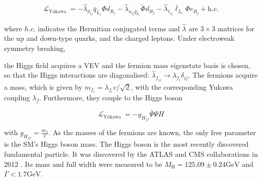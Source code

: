 \begin{equation}
  \mathcal{L}_{\text {Yukawa }}=-\hat{\lambda}_{d_{i j}} \bar{q}_{L_{i}} \Phi d_{R_{j}}-\hat{\lambda}_{u_{i j} \bar{q}_{L_{i}}} \tilde{\Phi} d_{R_{j}}-\hat{\lambda}_{\ell_{i j}} \bar{\ell}_{L_{i}} \Phi e_{R_{j}}+\text {h.c.}
\end{equation}

where $h.c.$ indicates the Hermitian conjugated terms and $\hat{\lambda}$ are $3 \times 3$ matrices for the up and down-type quarks, and the charged leptons. Under electroweak symmetry breaking,

the Higgs field acquires a VEV and the fermion mass eigenstate basis is chosen, so that the Higgs interactions are diagonalised: $\hat{\lambda}_{f_{i j}} \to \lambda_{f_{i}} \delta_{i j}$. The fermions acquire a mass, which is given by $m_{f_{i}}=\lambda_{f_{i}} v / \sqrt{2}$, with the corresponding Yukawa coupling $\lambda_{f}$. Furthermore, they couple to the Higgs boson

\begin{equation}
  \mathcal{L}_{\text {Yukawa }}=-g_{H_{f f}} \bar{\Psi} \Psi H
\end{equation}

with $g_{H_{f f}}=\frac{m_{f}}{v}$. As the masses of the fermions are known, the only free parameter is the SM's Higgs boson mass. The Higgs boson is the most recently discovered fundamental particle. It was discovered by the ATLAS and CMS collaborations in 2012 \cite{Chatrchyan:2013lba}. Its mass and full width were measured to be $M_{\mathrm{H}}=125.09 \pm 0.24 \mathrm{GeV}$ and $\Gamma<1.7 \mathrm{GeV}$.

